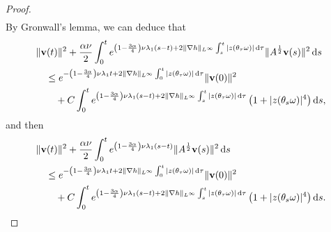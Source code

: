\documentclass{elsarticle}
\theoremstyle{definition}
\numberwithin{equation}{section}
\renewcommand{\d}{{\rm{d}}}
\begin{document}
\begin{proof}
\begin{align*}
\end{align*}
By  Gronwall's lemma, we can deduce that
\begin{align}
&\|\textbf{v}(t)\|^2+\frac {\alpha \nu } 2\int_0^te^{ \left(1-\frac{3\alpha} 4\right )\nu  \lambda_1(s-t)+2\|\nabla h\|_{L^\infty}\int_{s}^t|z(\theta_\tau\omega)|\, \d \tau}\|A^{\frac12}\textbf{v}(s)\|^2\, \d s\nonumber\\
&\quad \leq e^{-\left(1-\frac{3\alpha} 4\right ) \nu  \lambda_1t+2\|\nabla h\|_{L^\infty}\int_{0}^t|z(\theta_\tau\omega)|\, \d \tau}\|\textbf{v}(0)\|^2  \nonumber \\
& \qquad
+C\int_0^te^{ \left(1-\frac{3\alpha} 4\right ) \nu \lambda_1(s-t)+2\|\nabla h\|_{L^\infty}\int_{s}^t|z(\theta_\tau\omega)|\, \d \tau}  \left (1+|z(\theta_s\omega)|^4 \right) \d s, \nonumber
\end{align}
and then
\begin{align}
&\|\textbf{v}(t)\|^2+\frac {\alpha \nu} 2\int_0^te^{ \left(1-\frac{3\alpha} 4\right ) \nu \lambda_1(s-t) }\|A^{\frac12}\textbf{v}(s)\|^2\, \d s\nonumber\\
&\quad \leq e^{-\left(1-\frac{3\alpha} 4\right ) \nu \lambda_1t+2\|\nabla h\|_{L^\infty}\int_{0}^t|z(\theta_\tau\omega)|\, \d \tau}\|\textbf{v}(0)\|^2  \nonumber \\
& \qquad
+C\int_0^te^{ \left(1-\frac{3\alpha} 4\right ) \nu \lambda_1(s-t)+2\|\nabla h\|_{L^\infty}\int_{s}^t|z(\theta_\tau\omega)|\, \d \tau}  \left (1+|z(\theta_s\omega)|^4 \right)  \d s. \label{sep6.5}
\end{align}


\end{proof}
\end{document}
